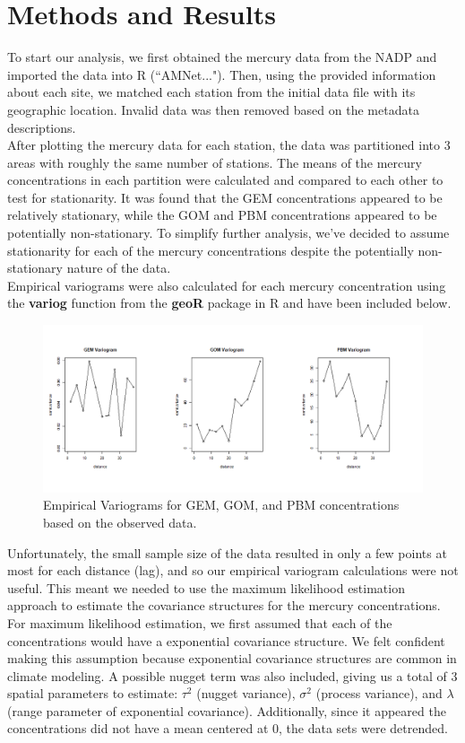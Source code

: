 \documentclass[12pt,a4]{article}
\theoremstyle{plain} %
\begin{document}
\section{Methods and Results}
To start our analysis, we first obtained the mercury data from the NADP and imported the data into R (``AMNet..."). Then, using the provided information about each site, we matched each station from the initial data file with its geographic location. Invalid data was then removed based on the metadata descriptions. \\
After plotting the mercury data for each station, the data was partitioned into 3 areas with roughly the same number of stations. The means of the mercury concentrations in each partition were calculated and compared to each other to test for stationarity. It was found that the GEM concentrations appeared to be relatively stationary, while the GOM and PBM concentrations appeared to be potentially non-stationary. To simplify further analysis, we've decided to assume stationarity for each of the mercury concentrations despite the potentially non-stationary nature of the data. \\
Empirical variograms were also calculated for each mercury concentration using the \textbf{variog} function from the \textbf{geoR} package in R and have been included below.
\begin{figure}[H]
    \centering
    \includegraphics[width=\linewidth]{merc_variograms.png}
    \caption{Empirical Variograms for GEM, GOM, and PBM concentrations based on the observed data.}
\end{figure}
Unfortunately, the small sample size of the data resulted in only a few points at most for each distance (lag), and so our empirical variogram calculations were not useful. This meant we needed to use the maximum likelihood estimation approach to estimate the covariance structures for the mercury concentrations. \\
For maximum likelihood estimation, we first assumed that each of the concentrations would have a exponential covariance structure. We felt confident making this assumption because exponential covariance structures are common in climate modeling. A possible nugget term was also included, giving us a total of 3 spatial parameters to estimate: $\tau^2$ (nugget variance), $\sigma^2$ (process variance), and $\lambda$ (range parameter of exponential covariance). Additionally, since it appeared the concentrations did not have a mean centered at 0, the data sets were detrended. \\
\end{document}
